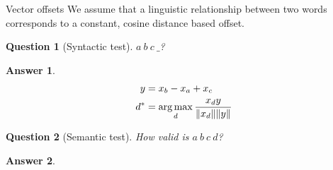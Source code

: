 \documentclass{beamer}
\newtheorem{question}{Question}
\newtheorem{answer}{Answer}
\DeclareMathOperator{\argmax}{arg\,max}
\DeclarePairedDelimiter{\norm}{\lVert}{\rVert}
\begin{document}
\begin{frame}{Vector offsets}
We assume that a linguistic relationship between two words corresponds to a constant, cosine distance based offset.
\begin{question}[Syntactic test]
$a\:b\ c\:\_$?
\end{question}
\begin{answer}
\nointerlineskip
\begin{align*}
y   &= x_b-x_a+x_c \\
d^* &= \argmax_d \frac{x_dy}{\norm{x_d}\norm{y}}
\end{align*}
\end{answer}
%
\begin{question}[Semantic test]
How valid is $a\:b\ c\:d$?
\end{question}
\begin{answer}
\end{answer}
\end{frame}
\end{document}
